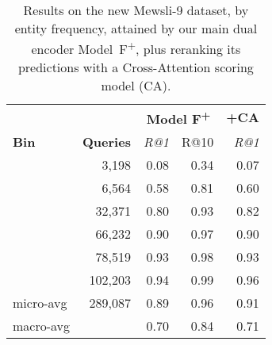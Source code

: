 \documentclass[11pt,a4paper]{article}
\begin{document}
\begin{table}[t]
\small
\centering
\begin{tabular}{l rrr r} \toprule
& & \multicolumn{2}{c}{\bf Model F\textsuperscript{+}} & \multicolumn{1}{c}{\bf +CA} \\ 
\cmidrule(lr){3-4}
\cmidrule(lr){5-5}
\textbf{Bin} & \textbf{Queries}  & \emph{R@1} & R@10 & \emph{R@1} \\
\midrule
 & 3,198 & 0.08 & 0.34 & 0.07 \\
  & 6,564 & 0.58 & 0.81 & 0.60 \\
 & 32,371 & 0.80 & 0.93 & 0.82 \\
 & 66,232 & 0.90 & 0.97 & 0.90 \\
 & 78,519 & 0.93 & 0.98 & 0.93 \\
  & 102,203 & 0.94 & 0.99 & 0.96 \\ \midrule
micro-avg & 289,087 & 0.89 & 0.96 & 0.91 \\
macro-avg &  & 0.70 & 0.84 & 0.71 \\ \bottomrule
\end{tabular}
\caption{Results on the new Mewsli-9 dataset, by entity frequency, attained by our main dual encoder Model~F\textsuperscript{+}, plus reranking its predictions with a Cross-Attention scoring model (CA).
\label{tab:wn9_results_bin}}
\end{table}
\end{document}
